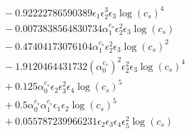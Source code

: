 \documentclass[10pt]{article}
\begin{document}
\begin{align*}
&{}  - 0.92222786590389 \epsilon_{1} \epsilon_{2}^{3} \epsilon_{3} \log{\left(c_{s} \right)}^{4} \\
&{}  - 0.0073838564830734 \alpha_{1}^{c_s} \epsilon_{2}^{2} \epsilon_{3} \log{\left(c_{s} \right)} \\
&{}  - 0.47404173076104 \alpha_{1}^{c_s} \epsilon_{2}^{2} \epsilon_{3} \log{\left(c_{s} \right)}^{2} \\
&{}  - 1.9120464431732 \left(\alpha_{0}^{c_s}\right)^{2} \epsilon_{2}^{2} \epsilon_{3} \log{\left(c_{s} \right)}^{4} \\
&{}  + 0.125 \alpha_{0}^{c_s} \epsilon_{2} \epsilon_{3}^{2} \epsilon_{4} \log{\left(c_{s} \right)}^{5} \\
&{}  + 0.5 \alpha_{0}^{c_s} \alpha_{1}^{c_s} \epsilon_{1} \epsilon_{2} \log{\left(c_{s} \right)}^{5} \\
&{}  + 0.055787239966231 \epsilon_{2} \epsilon_{3} \epsilon_{4} \epsilon_{5}^{2} \log{\left(c_{s} \right)}
\end{align*}
\end{document}
